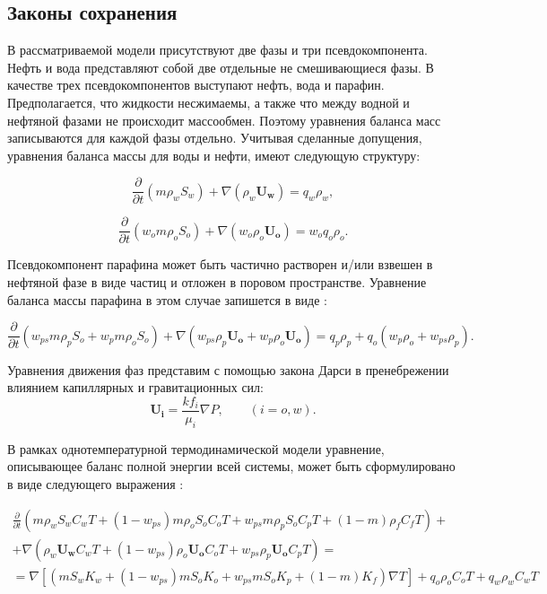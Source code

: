 \documentclass[a4paper,12pt]{article}
\begin{document}
\vspace{2em}
{\subsection*{\normalsize Законы сохранения}}
	В рассматриваемой модели присутствуют две фазы и три псевдокомпонента. Нефть и вода представляют собой две отдельные не смешивающиеся фазы. В качестве трех псевдокомпонентов выступают нефть, вода и парафин. Предполагается, что жидкости несжимаемы, а также что между водной и нефтяной фазами не происходит массообмен. Поэтому уравнения баланса масс записываются для каждой фазы отдельно. Учитывая сделанные допущения, уравнения баланса массы для воды и нефти, имеют следующую структуру:

\begin{equation}\label{eq1}
\frac{\partial }{\partial t}(m \rho_w S_w ) + \nabla(\rho_w \mathbf{U_w}) = q_w \rho_w,
\end{equation}

\begin{equation}\label{eq2}
\frac{\partial }{\partial t}(w_o  m \rho_o S_o) + \nabla(w_o \rho_o \mathbf{U_o}) = w_o q_o \rho_o.
\end{equation}

	Псевдокомпонент парафина может быть частично растворен и/или взвешен в нефтяной фазе в виде частиц и отложен в поровом пространстве. Уравнение баланса массы парафина в этом случае запишется в виде \cite{bib:02}:

\begin{equation}\label{eq3}
\frac{\partial}{\partial t}(w_{ps} m \rho_p S_o + w_p  m \rho_o S_o) + \nabla(w_{ps}  \rho_p \mathbf{U_o} + w_p \rho_o \mathbf{U_o}) = q_p \rho_p + q_o (w_p \rho_o + w_{ps} \rho_p).
\end{equation}

	Уравнения движения фаз представим с помощью закона Дарси в пренебрежении влиянием капиллярных и гравитационных сил:
\begin{equation}\label{eq4}
\mathbf{U_i} = \frac{k f_i}{\mu_i} \nabla P,  \qquad (i=o,w).
\end{equation}

	В рамках однотемпературной термодинамической модели  уравнение, описывающее баланс полной энергии всей системы, может быть сформулировано в виде следующего выражения \cite{bib:03}:

\begin{multline}\label{eq5}
\frac{\partial }
{\partial t}(m \rho_w S_w C_w T +(1-w_{ps})m \rho_o S_o C_o T + 
w_{ps}m \rho_p S_o C_p T +(1-m) \rho_f C_f T) + 
\\
+\nabla(\rho_w \mathbf{U_w} C_w T + (1-w_{ps}) \rho_o \mathbf{U_o} C_o T + w_{ps}\rho_p \mathbf{U_o} C_p T) = 
\\
=\nabla [(m S_w K_w + (1-w_{ps}) m S_o K_o  + w_{ps} m S_o K_p + (1-m) K_f) \nabla T ] + q_o \rho_o C_o T + q_w \rho_w C_w T
\end{multline}
\end{document}

